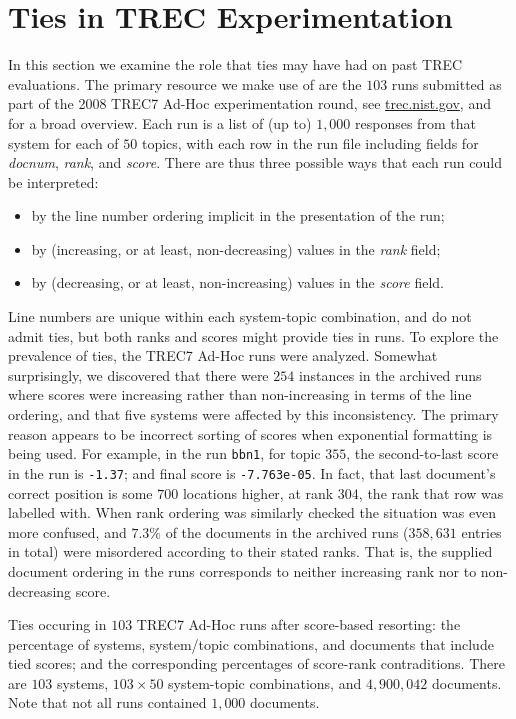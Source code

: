 \section{Ties in TREC Experimentation}
\label{sec-trecimpact}


In this section we examine the role that ties may have had on past
TREC evaluations.
The primary resource we make use of are the $103$ runs submitted as
part of the 2008 TREC7 Ad-Hoc experimentation round, see
{\small\url{trec.nist.gov}}, and {\citet{harman05trecbook}} for a
broad overview.
Each run is a list of (up to) $1{,}000$ responses from that system
for each of $50$ topics, with each row in the run file including
fields for {\emph{docnum}}, {\emph{rank}}, and {\emph{score}}.
There are thus three possible ways that each run could be
interpreted:
\begin{itemize}
\item
by the line number ordering implicit in the presentation of the run;
\item
by (increasing, or at least, non-decreasing) values in the
{\emph{rank}} field;
\item
by (decreasing, or at least, non-increasing) values in the
{\emph{score}} field.
\end{itemize}
Line numbers are unique within each system-topic combination, and do
not admit ties, but both ranks and scores might provide ties in runs.
To explore the prevalence of ties, the TREC7 Ad-Hoc runs were
analyzed.
Somewhat surprisingly, we discovered that there were $254$ instances
in the archived runs where scores were increasing rather than
non-increasing in terms of the line ordering, and that five systems
were affected by this inconsistency.
The primary reason appears to be incorrect sorting of scores when
exponential formatting is being used.
For example, in the run {\tt{bbn1}}, for topic $355$, the
second-to-last score in the run is {\tt{-1.37}}; and final score is
{\tt{-7.763e-05}}.
In fact, that last document's correct position is some $700$
locations higher, at rank $304$, the rank that row was labelled with.
When rank ordering was similarly checked the situation was even more
confused, and $7.3$\% of the documents in the archived runs
($358{,}631$ entries in total) were misordered according to their
stated ranks.
That is, the supplied document ordering in the runs corresponds to
neither increasing rank nor to non-decreasing score.

\begin{table}[t!]
\centering

\renewcommand{\tabcolsep}{0.5em}
\caption{Ties occuring in $103$ TREC7 Ad-Hoc runs after score-based
resorting: the percentage of systems, system/topic combinations, and
documents that include tied scores; and the corresponding percentages
of score-rank contraditions.
There are $103$ systems, $103\times50$ system-topic
combinations, and $4{,}900{,}042$ documents.
Note that not all runs contained $1{,}000$ documents.
\label{tbl-trec7-ties}}
\end{table}

